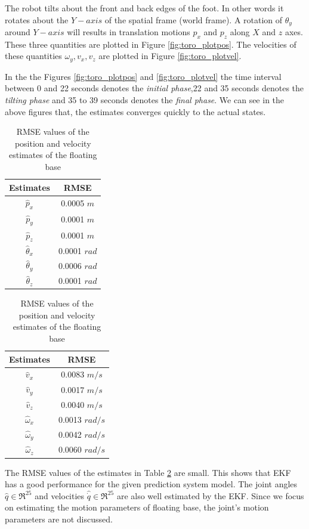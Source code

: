 The robot tilts about the front and back edges of the foot. In other words it rotates about the $Y-axis$ of the spatial frame (world frame). A rotation of $\theta_y$ around $Y-axis$ will results in translation motions $p_x$ and $p_z$ along $X$ and $z$ axes. These three quantities are plotted in Figure \ref{fig:toro_plotpos}. The velocities of these quantities $\omega_y,v_x,v_z$ are plotted in Figure \ref{fig:toro_plotvel}.

In the the Figures \ref{fig:toro_plotpos} and \ref{fig:toro_plotvel} the time interval between 0 and 22 seconds denotes the \emph{initial phase},22 and 35 seconds denotes the \emph{tilting phase} and 35 to 39 seconds denotes the \emph{final phase}. We can see in the above figures that, the estimates converges quickly to the actual states. 
\begin{table}[H]
    \centering
    \begin{tabular}{|c|c|}
    \hline
    Estimates &RMSE \\ \hline
    $\hat p_x$ &0.0005 $m$\\
    $\hat p_y$ &0.0001 $m$\\
    $\hat p_z$ &0.0001 $m$\\
    $\hat\theta_x$ &0.0001 $rad$\\
    $\hat\theta_y$ &0.0006 $rad$\\
    $\hat\theta_z$ &0.0001 $rad$\\ \hline
    \end{tabular} \hspace{1cm}
    \begin{tabular}{|c|c|}
    \hline
    Estimates &RMSE \\ \hline
    $\hat v_x$ &0.0083 $m/s$\\
    $\hat v_y$ &0.0017 $m/s$\\
    $\hat v_z$ &0.0040 $m/s$\\
    $\hat\omega_x$ &0.0013 $rad/s$\\
    $\hat\omega_y$ &0.0042 $rad/s$\\
    $\hat\omega_z$ &0.0060 $rad/s$\\ \hline
    \end{tabular}
    \caption{RMSE values of the position and velocity estimates of the floating base}
    \label{tab:toro_rmse}
\end{table}

The RMSE values of the estimates in Table \ref{tab:toro_rmse} are small. This shows that EKF has a good performance for the given prediction system model. The joint angles $ \hat q \in \Re^{25}$ and velocities $\hat \dot q \in \Re^{25}$ are also well estimated by the EKF. Since we focus on estimating the motion parameters of floating base, the joint's motion parameters are not discussed.

